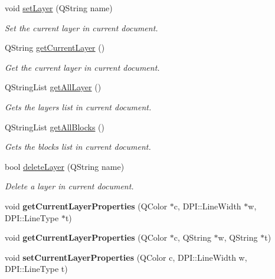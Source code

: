 \begin{DoxyCompactItemize}
\item 
void \hyperlink{classDoc__plugin__interface_ac4626840b1a927457f36f9645ea31829}{set\-Layer} (Q\-String name)
\begin{DoxyCompactList}\small\item\em Set the current layer in current document. \end{DoxyCompactList}\item 
Q\-String \hyperlink{classDoc__plugin__interface_a0a04bd2de92ccb38293179b43e316fdb}{get\-Current\-Layer} ()
\begin{DoxyCompactList}\small\item\em Get the current layer in current document. \end{DoxyCompactList}\item 
Q\-String\-List \hyperlink{classDoc__plugin__interface_a456ed0725c131b032ad0985fbb0b1980}{get\-All\-Layer} ()
\begin{DoxyCompactList}\small\item\em Gets the layers list in current document. \end{DoxyCompactList}\item 
Q\-String\-List \hyperlink{classDoc__plugin__interface_a68d6b64a9680c21fc6aa2f1cc8f97e20}{get\-All\-Blocks} ()
\begin{DoxyCompactList}\small\item\em Gets the blocks list in current document. \end{DoxyCompactList}\item 
bool \hyperlink{classDoc__plugin__interface_a6c4d88e581089d7217172ec25640a05e}{delete\-Layer} (Q\-String name)
\begin{DoxyCompactList}\small\item\em Delete a layer in current document. \end{DoxyCompactList}\item 
\hypertarget{classDoc__plugin__interface_a22bd2b351a06da3a110b1c858ce2ff74}{void {\bfseries get\-Current\-Layer\-Properties} (Q\-Color $\ast$c, D\-P\-I\-::\-Line\-Width $\ast$w, D\-P\-I\-::\-Line\-Type $\ast$t)}\label{classDoc__plugin__interface_a22bd2b351a06da3a110b1c858ce2ff74}

\item 
\hypertarget{classDoc__plugin__interface_aa2b1300b51715acb4470e778f93529a7}{void {\bfseries get\-Current\-Layer\-Properties} (Q\-Color $\ast$c, Q\-String $\ast$w, Q\-String $\ast$t)}\label{classDoc__plugin__interface_aa2b1300b51715acb4470e778f93529a7}

\item 
\hypertarget{classDoc__plugin__interface_abe1db88e3f419910b452a9f3040f846e}{void {\bfseries set\-Current\-Layer\-Properties} (Q\-Color c, D\-P\-I\-::\-Line\-Width w, D\-P\-I\-::\-Line\-Type t)}\label{classDoc__plugin__interface_abe1db88e3f419910b452a9f3040f846e}


\end{DoxyCompactItemize}
